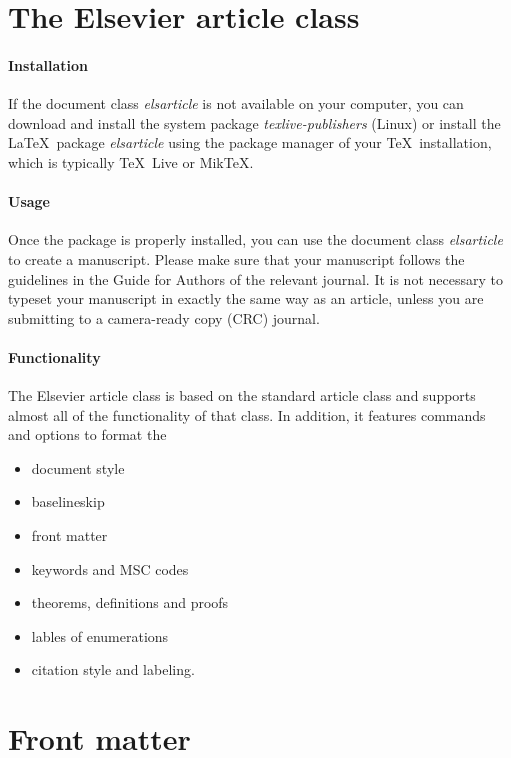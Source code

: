 \linenumbers

\section{The Elsevier article class}

\paragraph{Installation} If the document class \emph{elsarticle} is not available on your computer, you can download and install the system package \emph{texlive-publishers} (Linux) or install the \LaTeX\ package \emph{elsarticle} using the package manager of your \TeX\ installation, which is typically \TeX\ Live or Mik\TeX.

\paragraph{Usage} Once the package is properly installed, you can use the document class \emph{elsarticle} to create a manuscript. Please make sure that your manuscript follows the guidelines in the Guide for Authors of the relevant journal. It is not necessary to typeset your manuscript in exactly the same way as an article, unless you are submitting to a camera-ready copy (CRC) journal.

\paragraph{Functionality} The Elsevier article class is based on the standard article class and supports almost all of the functionality of that class. In addition, it features commands and options to format the
\begin{itemize}
\item document style
\item baselineskip
\item front matter
\item keywords and MSC codes
\item theorems, definitions and proofs
\item lables of enumerations
\item citation style and labeling.
\end{itemize}

\section{Front matter}

